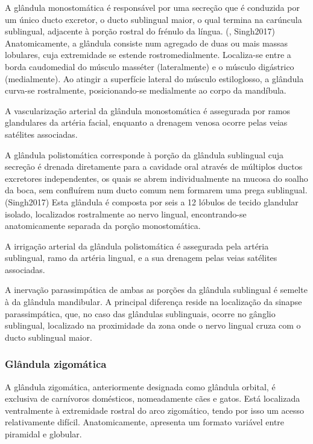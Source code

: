 A glândula monostomática é responsável por uma secreção que é conduzida por um único ducto excretor, o ducto sublingual maior, o qual termina na carúncula sublingual, adjacente à porção rostral do frénulo da língua. (\cite{evans_millers_2012}, Singh2017) Anatomicamente, a glândula consiste num agregado de duas ou mais massas lobulares, cuja extremidade se estende rostromedialmente. Localiza-se entre a borda caudomedial do músculo masséter (lateralmente) e o músculo digástrico (medialmente). Ao atingir a superfície lateral do músculo estiloglosso, a glândula curva-se rostralmente, posicionando-se medialmente ao corpo da mandíbula. \cite{evans_millers_2012}


A vascularização arterial da glândula monostomática é assegurada por ramos glandulares da artéria facial, enquanto a drenagem venosa ocorre pelas veias satélites associadas. \cite{evans_millers_2012}


A glândula polistomática corresponde à porção da glândula sublingual cuja secreção é drenada diretamente para a cavidade oral através de múltiplos ductos excretores independentes, os quais se abrem individualmente na mucosa do soalho da boca, sem confluírem num ducto comum nem formarem uma prega sublingual. (Singh2017)\cite{lobprise_oral_2019} Esta glândula é composta por seis  a 12 lóbulos de tecido glandular isolado, localizados rostralmente ao nervo lingual, encontrando-se anatomicamente separada da porção monostomática. \cite{evans_millers_2012}


A irrigação arterial da glândula polistomática é assegurada pela artéria sublingual, ramo da artéria lingual, e a sua drenagem pelas veias satélites associadas. \cite{evans_millers_2012}


A inervação parassimpática de ambas as porções da glândula sublingual é semel\cite{Han2016}te à da glândula mandibular. A principal diferença reside na localização da sinapse parassimpática, que, no caso das glândulas sublinguais, ocorre no gânglio sublingual, localizado na proximidade da zona onde o nervo lingual cruza com o ducto sublingual maior. \cite{evans_millers_2012}

\subsubsection{Glândula zigomática}

A glândula zigomática, anteriormente designada como glândula orbital, é exclusiva de carnívoros domésticos, nomeadamente cães e gatos. Está localizada ventralmente à extremidade rostral do arco zigomático, tendo por isso um acesso relativamente difícil.\cite{lobprise_oral_2019,evans_millers_2012} 
Anatomicamente, apresenta um formato variável entre piramidal e globular. 

